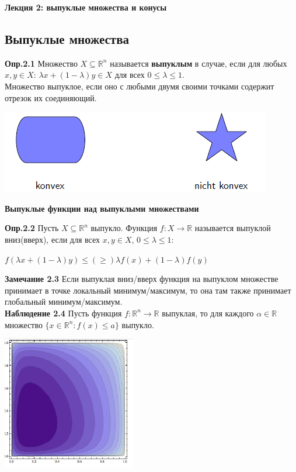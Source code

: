 {\Large \bf Лекция 2: выпуклые множества и конусы}\\

\subsection{Выпуклые множества}

{\bf Опр.2.1}
Множество $X \subseteq \mathbb{R}^n$ называется {\bf выпуклым} в случае, если для любых $x,y \in X$: $\lambda x+(1-\lambda)y \in X$ для всех $0 \le \lambda \le 1$.\\

Множество выпуклое, если оно с любыми двумя своими точками содержит отрезок их соединяющий.\\
\begin{center}
\includegraphics[scale=0.8]{image2.png}
\end{center}
{\bf Выпуклые функции над выпуклыми множествами}

{\bf Опр.2.2}
Пусть $X \subseteq \mathbb{R}^n$ выпукло. Функция $f:X \to \mathbb{R}$ называется выпуклой вниз(вверх), если для всех $x,y \in X$, $0 \le \lambda \le 1$:
\begin{center}
$f(\lambda x+(1-\lambda )y) \leq\left(\geq\right)  \lambda f(x)+(1-\lambda)f(y)$
\end{center}

{\bf Замечание 2.3}
Если выпуклая вниз/вверх функция на выпуклом множестве принимает в точке локальный минимум/максимум, то она там также принимает глобальный минимум/максимум.\\

{\bf Наблюдение 2.4} Пусть функция $f:\mathbb{R}^n \to \mathbb{R}$ выпуклая, то для каждого $\alpha\in\mathbb{R}$ множество $\{x\in\mathbb{R}^n: f(x)\leq a\}$ выпукло.\\
\begin{center}
\includegraphics[scale=0.8]{image3.png}
\end{center}

